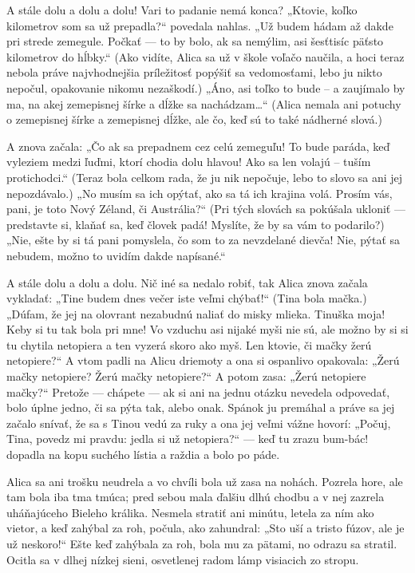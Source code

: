 \documentclass[12pt]{book}
\begin{document}
\begin{Parallel}[p]{}{}
{A stále dolu a dolu a dolu! Vari to padanie nemá konca? „Ktovie, koľko kilometrov som sa už prepadla?“ povedala nahlas. „Už budem hádam až dakde pri strede zemegule. Počkať — to by bolo, ak sa nemýlim, asi šesťtisíc päťsto kilometrov do hĺbky.“ (Ako vidíte, Alica sa už v škole voľačo naučila, a hoci teraz nebola práve najvhodnejšia príležitosť popýšiť sa vedomosťami, lebo ju nikto nepočul, opakovanie nikomu nezaškodí.) „Áno, asi toľko to bude – a zaujímalo by ma, na akej zemepisnej šírke a dĺžke sa nachádzam…“ (Alica nemala ani potuchy o zemepisnej šírke a zemepisnej dĺžke, ale čo, keď sú to také nádherné slová.)

A znova začala: „Čo ak sa prepadnem cez celú zemeguľu! To bude paráda, keď vyleziem medzi ľuďmi, ktorí chodia dolu hlavou! Ako sa len volajú – tuším protichodci.“ (Teraz bola celkom rada, že ju nik nepočuje, lebo to slovo sa ani jej nepozdávalo.) „No musím sa ich opýtať, ako sa tá ich krajina volá. Prosím vás, pani, je toto Nový Zéland, či Austrália?“ (Pri tých slovách sa pokúšala ukloniť — predstavte si, klaňať sa, keď človek padá! Myslíte, že by sa vám to podarilo?) „Nie, ešte by si tá pani pomyslela, čo som to za nevzdelané dievča! Nie, pýtať sa nebudem, možno to uvidím dakde napísané.“

A stále dolu a dolu a dolu. Nič iné sa nedalo robiť, tak Alica znova začala vykladať: „Tine budem dnes večer iste veľmi chýbať!“ (Tina bola mačka.) „Dúfam, že jej na olovrant nezabudnú naliať do misky mlieka. Tinuška moja! Keby si tu tak bola pri mne! Vo vzduchu asi nijaké myši nie sú, ale možno by si si tu chytila netopiera a ten vyzerá skoro ako myš. Len ktovie, či mačky žerú netopiere?“ A vtom padli na Alicu driemoty a ona si ospanlivo opakovala: „Žerú mačky netopiere? Žerú mačky netopiere?“ A potom zasa: „Žerú netopiere mačky?“ Pretože — chápete — ak si ani na jednu otázku nevedela odpovedať, bolo úplne jedno, či sa pýta tak, alebo onak. Spánok ju premáhal a práve sa jej začalo snívať, že sa s Tinou vedú za ruky a ona jej veľmi vážne hovorí: „Počuj, Tina, povedz mi pravdu: jedla si už netopiera?“ — keď tu zrazu bum-bác! dopadla na kopu suchého lístia a raždia a bolo po páde.

Alica sa ani trošku neudrela a vo chvíli bola už zasa na nohách. Pozrela hore, ale tam bola iba tma tmúca; pred sebou mala ďalšiu dlhú chodbu a v nej zazrela uháňajúceho Bieleho králika. Nesmela stratiť ani minútu, letela za ním ako vietor, a keď zahýbal za roh, počula, ako zahundral: „Sto uší a tristo fúzov, ale je už neskoro!“ Ešte keď zahýbala za roh, bola mu za pätami, no odrazu sa stratil. Ocitla sa v dlhej nízkej sieni, osvetlenej radom lámp visiacich zo stropu.

}
\end{Parallel}
\end{document}
